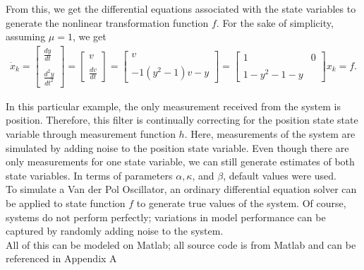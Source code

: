\noindent From this, we get the differential equations associated with the state variables to generate the nonlinear transformation function $f$. For the sake of simplicity, assuming $\mu = 1$, we get
\begin{align*}
\dot x_k  = 
	\begin{bmatrix}
           \frac{dy}{dt}  \\ \\
           \frac{d^2y}{dt^2} 
           \end{bmatrix} = 
           \begin{bmatrix}
          v \\ \\
           \frac{dv}{dt} 
           \end{bmatrix}  =
           \begin{bmatrix}
           v \\ \\
           -1 (y^2 - 1)v - y 
           \end{bmatrix}=
           \begin{bmatrix}
           1 & 0 \\ \\
           1- y^2 - 1 - y 
           \end{bmatrix} x_k 
           =
           f.
\end{align*}


\noindent In this particular example, the only measurement received from the system is position. Therefore, this filter is continually correcting for the position state state variable through measurement function $h$. Here, measurements of the system are simulated by adding noise to the position state variable. Even though there are only measurements for one state variable, we can still generate estimates of both state variables. In terms of parameters $\alpha, \kappa$, and $\beta$, default values were used.\\ 

\noindent To simulate a Van der Pol Oscillator, an ordinary differential equation solver can be applied to state function $f$ to generate true values of the system. Of course, systems do not perform perfectly; variations in model performance can be captured by randomly adding noise to the system. \\

\noindent All of this can be modeled on Matlab; all source code is from Matlab and can be referenced in Appendix A \cite{matlab /& simulink}

